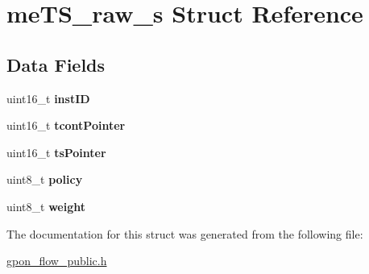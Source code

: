 \hypertarget{structmeTS__raw__s}{}\section{me\+T\+S\+\_\+raw\+\_\+s Struct Reference}
\label{structmeTS__raw__s}
\subsection*{Data Fields}
\begin{DoxyCompactItemize}
\item 
\mbox{\label{structmeTS__raw__s_a36cd854c3eb3340e3cc77a3cd1bebfad}} 
uint16\+\_\+t {\bfseries inst\+ID}
\item 
\mbox{\label{structmeTS__raw__s_a309c044e1b92d37afe468b720f20bc00}} 
uint16\+\_\+t {\bfseries tcont\+Pointer}
\item 
\mbox{\label{structmeTS__raw__s_a01037eff4694cd79b85f8158ec3dd21a}} 
uint16\+\_\+t {\bfseries ts\+Pointer}
\item 
\mbox{\label{structmeTS__raw__s_a7cfb9e14cf2d9c90fae1ab17bd99b854}} 
uint8\+\_\+t {\bfseries policy}
\item 
\mbox{\label{structmeTS__raw__s_ae56d0b09cc7b3bf1c65ecb31b969ed1b}} 
uint8\+\_\+t {\bfseries weight}
\end{DoxyCompactItemize}


The documentation for this struct was generated from the following file\+:\begin{DoxyCompactItemize}
\item 
\hyperlink{gpon__flow__public_8h}{gpon\+\_\+flow\+\_\+public.\+h}\end{DoxyCompactItemize}
